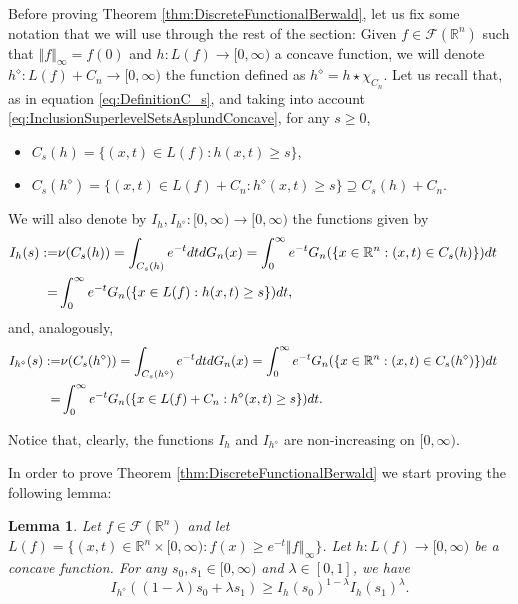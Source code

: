 \documentclass{amsart}
\newcommand{\R}{\mathbb R}
\newcommand{\norma}[1]{\left\Vert#1\right\Vert}
\newtheorem{lemma}{Lemma}[section]
\theoremstyle{remark}
\theoremstyle{definition}
\numberwithin{equation}{section}
\begin{document}
Before proving Theorem \ref{thm:DiscreteFunctionalBerwald}, let us fix some notation that we will use through the rest of the section: Given $f\in\mathcal{F}(\R^n)$ such that $\norma{f}_{\infty}=f(0)$ and $h: L(f) \to [0, \infty)$ a concave function, we will denote $h^{\diamond}: L(f)+C_n\to[0,\infty)$ the function defined as $h^{\diamond}=h\star\chi_{C_n}$. Let us recall that, as in equation \eqref{eq:DefinitionC_s}, and taking into account \eqref{eq:InclusionSuperlevelSetsAsplundConcave}, for any $s\geq 0$,
\begin{itemize}
	\item $C_s(h)=\{ (x,t) \in L(f): h(x,t) \geq s \}$,
	\item $C_s(h^{\diamond})=\{ (x,t) \in L(f)+C_n: h^{\diamond}(x,t) \geq s \}\supseteq C_s(h)+C_n$.
\end{itemize}

We will also denote by $I_h, I_{h^{\diamond}} \colon [0,\infty) \to [0,\infty)$ the functions given by
\begin{align*}
I_h(s):=& \nu(C_s(h))=\int_{C_s(h)} e^{-t} dt dG_n(x)=\int_0^{\infty} e^{-t} G_n(\{ x \in \R^n: (x,t)\in C_s(h) \}) dt\cr
=& \int_0^{\infty} e^{-t} G_n(\{ x \in L(f): h(x,t) \geq s \}) dt,
\end{align*}
and, analogously,
\begin{align*}
I_{h^{\diamond}}(s):=&\nu(C_s(h^\diamond))=\int_{C_s(h^{\diamond})} e^{-t} dt dG_n(x)=\int_0^{\infty} e^{-t} G_n(\{ x \in \R^n: (x,t)\in C_s (h^{\diamond}) \}) dt \cr
=& \int_0^{\infty} e^{-t} G_n(\{ x \in L(f)+C_n: h^{\diamond}(x,t) \geq s \}) dt.
\end{align*}

Notice that, clearly, the functions $I_h$ and $I_{h^\diamond}$ are non-increasing on $[0,\infty)$.

In order to prove Theorem \ref{thm:DiscreteFunctionalBerwald} we start proving the following lemma:

\begin{lemma}\label{lem:LogConcFunctionalDiscreteBerwald}
Let $f \in \mathcal{F}(\R^n)$ and let $L(f)=\{ (x,t) \in \R^n \times [0,\infty): f(x) \geq e^{-t} \norma{f}_{\infty} \}$. Let $h \colon L(f) \to [0, \infty)$ be a concave function. For any $s_0, s_1 \in [0,\infty)$ and $\lambda \in [0,1]$, we have
\[
I_{h^{\diamond}} ((1-\lambda)s_0 +\lambda s_1) \geq I_h(s_0)^{1-\lambda} I_h(s_1)^{\lambda}.
\]
\end{lemma}
\end{document}

